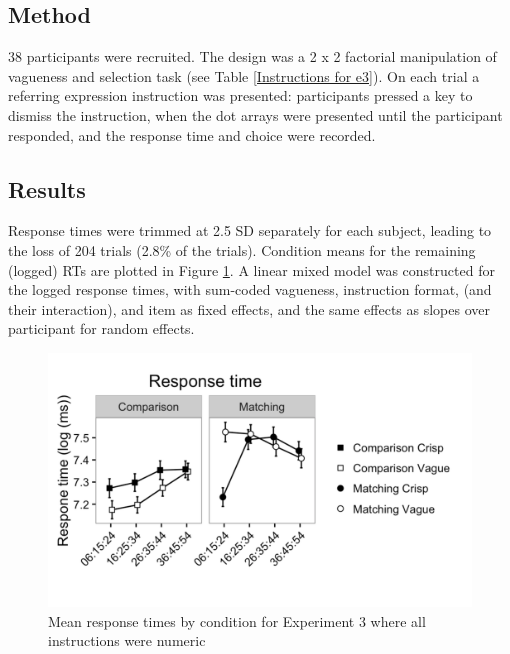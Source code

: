 \documentclass[%
man,		%
floatsintext,%
apacite%
]{apa6}
\begin{document}
\subsection{Method} %

38 participants were recruited. 
The design was a 2 x 2 factorial manipulation of vagueness and selection task (see Table \ref{Instructions for e3}).
On each trial a referring expression instruction was presented: participants pressed a key to dismiss the instruction, when the dot arrays were presented until the participant responded, and the response time and choice were recorded.

\subsection{Results} %

Response times were trimmed at 2.5 SD separately for each subject, leading to the loss of 204 trials (2.8\% of the trials).
Condition means for the remaining (logged) RTs are plotted in Figure \ref{resultse3}.
A linear mixed model was constructed for the logged response times, 
with sum-coded vagueness, instruction format, (and their interaction), and item as fixed effects, and the same effects as slopes over participant for random effects.

\begin{figure}[htbp]
\centering
\includegraphics[trim = 0mm 30mm 0mm 10mm, clip, width=.75\textwidth]{images/rtplote3}
\caption{Mean response times by condition for Experiment 3 where all instructions were numeric}
\label{resultse3}
\end{figure}
\end{document}
